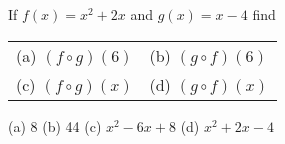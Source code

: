{If $f(x)=x^2+2x$ and $g(x)=x-4$ find
\begin{tabular}{ll}
(a) $(f \circ g)(6)$ & (b) $(g \circ f)(6)$ \\
(c) $(f \circ g)(x)$ & (d) $(g \circ f)(x)$
\end{tabular}}
{(a) 8 \qquad (b) 44 \qquad (c) $x^2-6x+8$ \qquad (d) $x^2+2x-4$}
